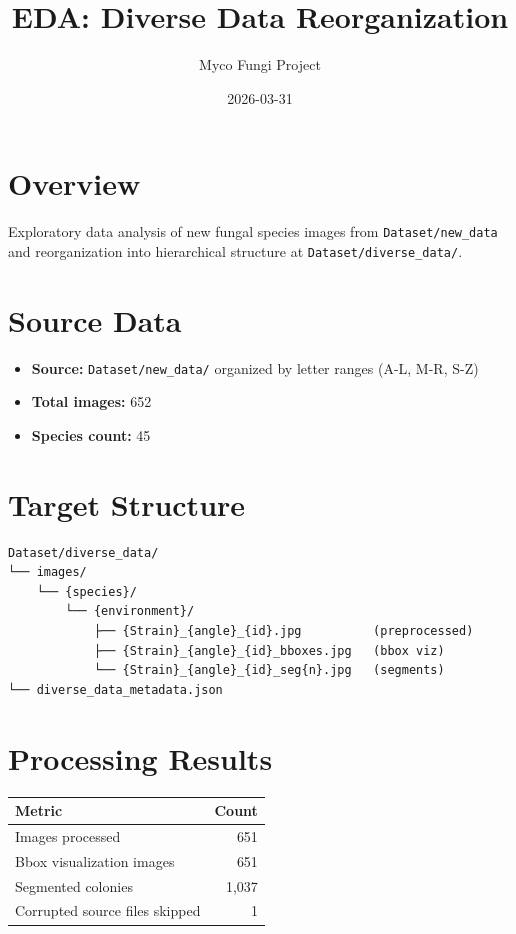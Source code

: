 \documentclass[11pt]{article}
\title{EDA: Diverse Data Reorganization}
\author{Myco Fungi Project}
\date{2026-03-31}
\begin{document}
\maketitle

\section{Overview}
Exploratory data analysis of new fungal species images from \texttt{Dataset/new\_data} and reorganization into hierarchical structure at \texttt{Dataset/diverse\_data/}.

\section{Source Data}
\begin{itemize}
\item \textbf{Source:} \texttt{Dataset/new\_data/} organized by letter ranges (A-L, M-R, S-Z)
\item \textbf{Total images:} 652
\item \textbf{Species count:} 45
\end{itemize}

\section{Target Structure}
\begin{verbatim}
Dataset/diverse_data/
└── images/
    └── {species}/
        └── {environment}/
            ├── {Strain}_{angle}_{id}.jpg          (preprocessed)
            ├── {Strain}_{angle}_{id}_bboxes.jpg   (bbox viz)
            └── {Strain}_{angle}_{id}_seg{n}.jpg   (segments)
└── diverse_data_metadata.json
\end{verbatim}

\section{Processing Results}
\begin{table}[H]
\centering
\begin{tabular}{lr}
\toprule
Metric & Count \\
\midrule
Images processed & 651 \\
Bbox visualization images & 651 \\
Segmented colonies & 1,037 \\
Corrupted source files skipped & 1 \\
\bottomrule
\end{tabular}
\end{table}
\end{document}
